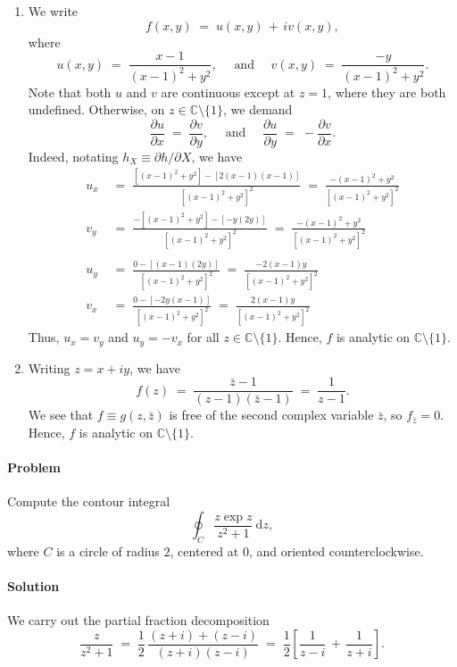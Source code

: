 \documentclass[10pt]{article}
\newcounter{prob}
\def\problem{\stepcounter{prob}\paragraph{Problem \arabic{prob}}}
\def\solution{\paragraph{Solution}}
\begin{document}
        \begin{enumerate}
                \item We write
                \[
                f(x, y) \;=\; u(x, y) \,+\, iv(x, y),
                \]
                where
                \[
                u(x, y) \;=\; \frac{x - 1}{(x - 1)^2 + y^2}, \quad\text{ and }\quad v(x, y) \;=\; \frac{-y}{(x - 1)^2 + y^2} .
                \]
                Note that both $u$ and $v$ are continuous except at $z = 1$, where they are both undefined. Otherwise, on $z \in \mathbb{C}\setminus\{1\}$,
                we demand
                \[
                \frac{\partial u}{\partial x} \;=\; \frac{\partial v}{\partial y}, \quad\text{ and }\quad
                \frac{\partial u}{\partial y} \;=\; -\frac{\partial v}{\partial x}.
                \]
                Indeed, notating $h_X \equiv {\partial h}/{\partial X}$, we have
                \begin{align*}
                u_x \;&=\; \frac{[(x - 1)^2 + y^2] - [2(x - 1)(x - 1)]}{[(x - 1)^2 + y^2]^2} \;=\; \frac{-(x-1)^2 + y^2}{[(x - 1)^2 + y^2]^2} \\
                v_y \;&=\; \frac{-[(x-1)^2 + y^2] - [-y(2y)]}{[(x-1)^2 + y^2]^2} \;=\; \frac{-(x-1)^2 + y^2}{[(x-1)^2 + y^2]^2} \\\\ 
                u_y \;&=\; \frac{0 - [(x - 1)(2y)]}{[(x - 1)^2 + y^2]^2} \;=\; \frac{-2(x - 1)y}{[(x - 1)^2 + y^2]^2} \\
                v_x \;&=\; \frac{0 - [-2y(x - 1)]}{[(x - 1)^2 + y^2]^2}  \;=\; \frac{2(x - 1)y}{[(x - 1)^2 + y^2]^2} 
                \end{align*}
                Thus, $u_x = v_y$ and $u_y = -v_x$ for all $z \in \mathbb{C}\setminus\{1\}$. Hence, $f$ is analytic on $\mathbb{C}\setminus\{1\}$.

                \item Writing $z = x + iy$, we have
                \[
                f(z) \;=\; \frac{\bar{z} - 1}{(z - 1)(\bar{z} - 1)} \;=\; \frac{1}{z - 1}.
                \]
                We see that $f \equiv g(z, \bar{z})$ is free of the second complex variable $\bar{z}$, so $f_{\bar{z}} = 0$. Hence,
                $f$ is analytic on $\mathbb{C}\setminus\{1\}$.
        \end{enumerate}

        \problem Compute the contour integral
        \[
                \oint_C \frac{z \exp{z}}{z^2 + 1} \:\mathrm{d}z,
        \]
        where $C$ is a circle of radius $2$, centered at $0$, and oriented counterclockwise.
        \solution We carry out the partial fraction decomposition
        \[
        \frac{z}{z^2 + 1} \;=\; \frac{1}{2}\,\frac{(z + i) + (z - i)}{(z + i)(z - i)} \;=\; \frac{1}{2}\left[\frac{1}{z - i} \,+\, \frac{1}{z + i}\right].
        \]
\end{document}
